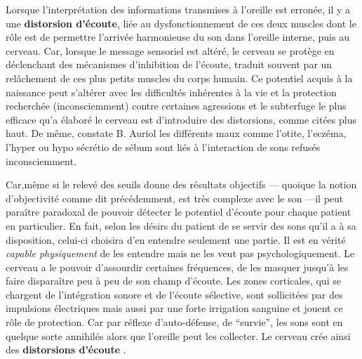 Lorsque l'interprétation des informations transmises à l'oreille est
erronée, il y a une 
\textbf{distorsion d'écoute}, liée au dysfonctionnement
de ces deux muscles dont le rôle est de permettre l'arrivée
harmonieuse du son dans l'oreille interne, puis au cerveau. Car, lorsque
le message sensoriel est altéré, le cerveau se protège en déclenchant
des mécanismes d'inhibition de l'écoute, traduit souvent par un relâchement de
ces plus petits muscles du corps humain. Ce potentiel acquis à
la naissance peut s'altérer avec les difficultés inhérentes à
la vie et la protection recherchée (inconsciemment) contre certaines agressions et le subterfuge le plus
efficace qu'a élaboré le cerveau est
d'introduire des distorsions, comme citées plus haut. De même, constate B. Auriol
les différents maux comme l'otite, l'eczéma, l'hyper
ou hypo sécrétio de sébum sont liés à l'interaction de sons refusés
inconsciemment.  \autocite  [19--20] {auriol:cle}




Car,même si le relevé des seuils donne des résultats objectifs ---
quoique la notion d'objectivité comme dit précédemment, est très
complexe avec le son ---il peut paraître paradoxal de pouvoir détecter
le potentiel d'écoute pour chaque patient en particulier.  En fait,
selon les désirs du patient de se servir des sons qu'il a à sa
disposition, celui-ci choisira d'en entendre seulement une partie. Il
est en vérité \textit{capable physiquement} de les entendre mais ne
les veut pas psychologiquement. Le cerveau a le pouvoir d'assourdir
certaines fréquences, de les masquer jusqu'à les faire disparaître peu
à peu de son champ d'écoute. Les zones corticales, qui se chargent de
l'intégration sonore et de l'écoute sélective, sont sollicitées par
des impulsions électriques mais aussi par une forte irrigation
sanguine et jouent ce rôle de protection.  \autocite [14] {auriol:cle}
Car par réflexe d'auto-défense, de ``survie'', les sons sont en
quelque sorte annihilés alors que l'oreille peut les collecter. Le
cerveau crée ainsi des\textbf{ distorsions d'écoute}
\autocite{tomatis:education}.

  



  




 




  

